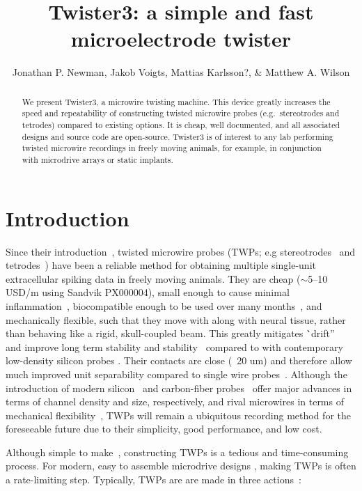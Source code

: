 \documentclass[11pt,a4paper]{article}
\title{Twister3: a simple and fast microelectrode twister}
\author{Jonathan P. Newman, Jakob Voigts, Mattias Karlsson?, \& Matthew A. Wilson}
\begin{document}
\maketitle

\begin{abstract}
    \noindent
    We present Twister3, a microwire twisting machine. This device greatly
    increases the speed and repeatability of constructing twisted microwire
    probes (e.g.\ stereotrodes and tetrodes) compared to existing options. It is
    cheap, well documented, and all associated designs and source code are
    open-source. Twister3 is of interest to any lab performing twisted
    microwire recordings in freely moving animals, for example, in conjunction
    with microdrive arrays or static implants.
\end{abstract}

\tableofcontents

\section{Introduction}
Since their introduction~\cite{}, twisted microwire probes (TWPs; e.g
stereotrodes~\cite{} and tetrodes~\cite{}) have been a reliable method for
obtaining multiple single-unit extracellular spiking data in freely moving
animals. They are cheap ($\sim$5--10 USD/m using Sandvik PX000004), small enough
to cause minimal inflammation~\cite{}, biocompatible enough to be used over
many months~\cite{}, and mechanically flexible, such that they move with along
with neural tissue, rather than behaving like a rigid, skull-coupled beam. This
greatly mitigates \``drift''~\cite{} and improve long term stability and
stability~\cite{} compared to with contemporary low-density silicon probes
\url{}. Their contacts are close (~20 um) and therefore allow much improved
unit separability compared to single wire probes~\cite{}. Although the
introduction of modern silicon~\cite{} and carbon-fiber probes~\cite{} offer
major advances in terms of channel density and size, respectively, and rival
microwires in terms of mechanical flexibility~\cite{}, TWPs will remain a
ubiquitous recording method for the foreseeable future due to their simplicity,
good performance, and low cost.

Although simple to make~\cite{}, constructing TWPs is a tedious and
time-consuming process. For modern, easy to assemble microdrive designs
\cite{}, making TWPs is often a rate-limiting step. Typically, TWPs are are
made in three actions~\cite{}:
\end{document}
